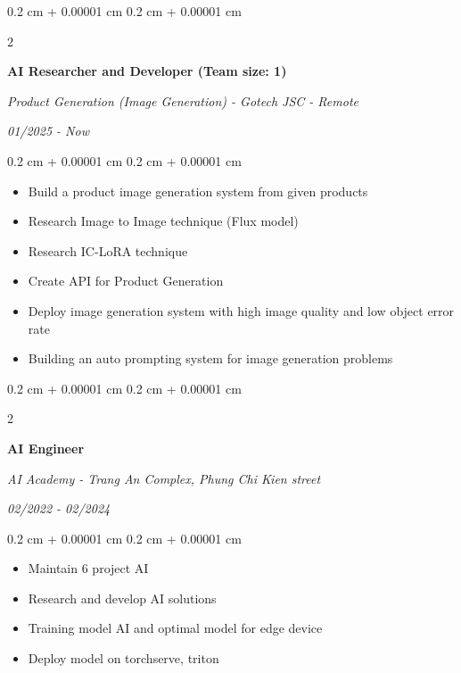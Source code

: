 \documentclass[10pt, letterpaper]{article}
\newenvironment{highlights}{
    \begin{itemize}[
        topsep=0.10 cm,
        parsep=0.10 cm,
        partopsep=0pt,
        itemsep=0pt,
        leftmargin=0.4 cm + 10pt
    ]
}{
    \end{itemize}
} %
\newenvironment{onecolentry}{
    \begin{adjustwidth}{
        0.2 cm + 0.00001 cm
    }{
        0.2 cm + 0.00001 cm
    }
}{
    \end{adjustwidth}
} %
\newenvironment{twocolentry}[2][]{
    \onecolentry
    \def\secondColumn{#2}
    \setcolumnwidth{\fill, 4.5 cm}
    \begin{paracol}{2}
}{
    \switchcolumn \raggedleft \secondColumn
    \end{paracol}
    \endonecolentry
} %
\begin{document}
    \vspace{0.2 cm}

    \begin{twocolentry}{
        \textit{01/2025 - Now}
    }
        \textbf{AI Researcher and Developer (Team size: 1)}
        
        \textit{Product Generation (Image Generation) - Gotech JSC - Remote}
    \end{twocolentry}

    \begin{onecolentry}
        \begin{highlights}
            \item Build a product image generation system from given products
            \item Research Image to Image technique (Flux model)
            \item Research IC-LoRA technique
            \item Create API for Product Generation
            \item Deploy image generation system with high image quality and low object error rate
            \item Building an auto prompting system for image generation problems
        \end{highlights}
    \end{onecolentry}

    \vspace{0.2 cm}

    \begin{twocolentry}{
        \textit{02/2022 - 02/2024}
    }
        \textbf{AI Engineer}
        
        \textit{AI Academy - Trang An Complex, Phung Chi Kien street}
    \end{twocolentry}

    \begin{onecolentry}
        \begin{highlights}
            \item Maintain 6 project AI
            \item Research and develop AI solutions
            \item Training model AI and optimal model for edge device
            \item Deploy model on torchserve, triton
        \end{highlights}
    \end{onecolentry}

    \vspace{0.2 cm}
\end{document}
